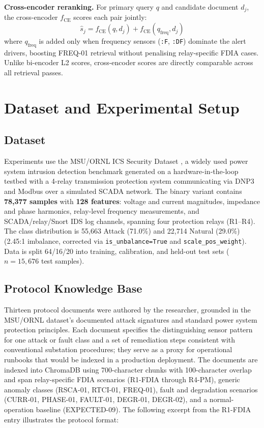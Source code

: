 \documentclass[twocolumn, 10pt, letterpaper]{article}
\begin{document}
\textbf{Cross-encoder reranking.}
For primary query $q$ and candidate document $d_j$, the cross-encoder
$f_{\text{CE}}$ scores each pair jointly:
\begin{equation}
    \hat{s}_j = f_{\text{CE}}(q, d_j) + f_{\text{CE}}(q_{\text{freq}}, d_j)
    \label{eq:ce}
\end{equation}
where $q_{\text{freq}}$ is added only when frequency sensors
(\texttt{:F}, \texttt{:DF}) dominate the alert drivers, boosting FREQ-01
retrieval without penalising relay-specific FDIA cases.
Unlike bi-encoder L2 scores, cross-encoder scores are directly comparable
across all retrieval passes.

\section{Dataset and Experimental Setup}
\label{sec:setup}

\subsection{Dataset}

Experiments use the MSU/ORNL ICS Security Dataset \cite{morris2014ics},
a widely used power system intrusion detection benchmark generated on a
hardware-in-the-loop testbed with a 4-relay transmission protection system
communicating via DNP3 and Modbus over a simulated SCADA network.
The binary variant contains \textbf{78,377 samples} with \textbf{128 features}:
voltage and current magnitudes, impedance and phase harmonics, relay-level
frequency measurements, and SCADA/relay/Snort IDS log channels, spanning
four protection relays (R1--R4).
The class distribution is 55,663 Attack (71.0\%) and 22,714 Natural (29.0\%)
(2.45:1 imbalance, corrected via \texttt{is\_unbalance=True} and
\texttt{scale\_pos\_weight}).
Data is split 64/16/20 into training, calibration, and held-out test sets
($n{=}15{,}676$ test samples).

\subsection{Protocol Knowledge Base}

Thirteen protocol documents were authored by the researcher, grounded in the
MSU/ORNL dataset's documented attack signatures \cite{morris2014ics} and
standard power system protection principles.
Each document specifies the distinguishing sensor pattern for one attack or fault
class and a set of remediation steps consistent with conventional substation
procedures; they serve as a proxy for operational runbooks that would be
indexed in a production deployment.
The documents are indexed into ChromaDB using 700-character chunks with
100-character overlap and span relay-specific FDIA scenarios (R1-FDIA through
R4-PM), generic anomaly classes (RSCA-01, RTCI-01, FREQ-01), fault and
degradation scenarios (CURR-01, PHASE-01, FAULT-01, DEGR-01, DEGR-02), and a
normal-operation baseline (EXPECTED-09).
The following excerpt from the R1-FDIA entry illustrates the protocol format:
\end{document}
